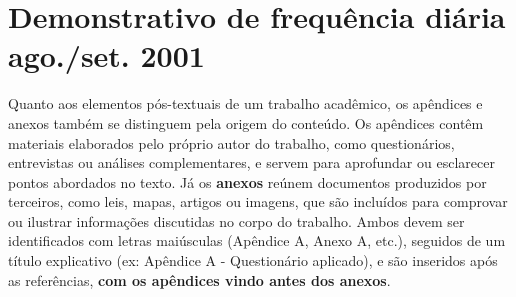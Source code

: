 
{\let\clearpage\relax \chapter{\textbf{Demonstrativo de frequência diária ago./set. 2001}}}

Quanto aos elementos pós-textuais de um trabalho acadêmico, os apêndices e anexos também se distinguem pela origem do conteúdo. Os apêndices contêm materiais elaborados pelo próprio autor do trabalho, como questionários, entrevistas ou análises complementares, e servem para aprofundar ou esclarecer pontos abordados no texto. Já os \textbf{anexos} reúnem documentos produzidos por terceiros, como leis, mapas, artigos ou imagens, que são incluídos para comprovar ou ilustrar informações discutidas no corpo do trabalho. Ambos devem ser identificados com letras maiúsculas (Apêndice A, Anexo A, etc.), seguidos de um título explicativo (ex: Apêndice A - Questionário aplicado), e são inseridos após as referências, \textbf{com os apêndices vindo antes dos anexos}.

